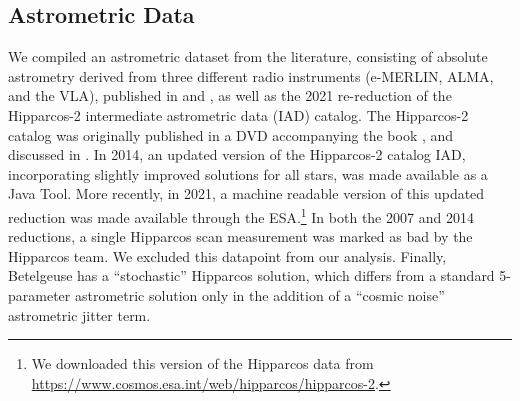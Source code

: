 \documentclass[twocolumn]{aastex631}
\begin{document}
\subsection{Astrometric Data}

We compiled an astrometric dataset from the literature, consisting of absolute astrometry derived from three different radio instruments (e-MERLIN, ALMA, and the VLA), published in \cite{Harper:2008a} and \cite{2017AJ....154...11H}, as well as the 2021 re-reduction of the Hipparcos-2 intermediate astrometric data (IAD) catalog. The Hipparcos-2 catalog was originally published in a DVD accompanying the book \cite{van-Leeuwen:2007a}, and discussed in \cite{van-Leeuwen:2007b}. In 2014, an updated version of the Hipparcos-2 catalog IAD, incorporating slightly improved solutions for all stars, was made available as a Java Tool. More recently, in 2021, a machine readable version of this updated reduction was made available through the ESA.\footnote{We downloaded this version of the Hipparcos data from \url{https://www.cosmos.esa.int/web/hipparcos/hipparcos-2}.} In both the 2007 and 2014 reductions, a single Hipparcos scan measurement was marked as bad by the Hipparcos team. We excluded this datapoint from our analysis. Finally, Betelgeuse has a ``stochastic'' Hipparcos solution, which differs from a standard 5-parameter astrometric solution only in the addition of a ``cosmic noise'' astrometric jitter term.
\end{document}
